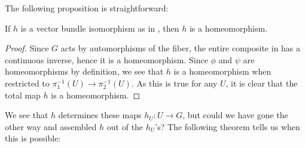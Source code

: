 \documentclass[11pt]{book}
\begin{document}
The following proposition is straightforward:

\begin{proposition} If $h$ is a vector bundle isomorphism as in , then $h$ is a homeomorphism.
\end{proposition}
\begin{proof} Since $G$ acts by automorphisms of the fiber, the entire composite in  has a continuous inverse, hence it is a homeomorphism. Since $\phi$ and $\psi$ are homeomorphisms by definition, we see that $h$ is a homeomorphism when restricted to $\pi_1^{-1}(U) \to \pi_2^{-1}(U)$. As this is true for any $U$, it is clear that the total map $h$ is a homeomorphism.
\end{proof}

We see that $h$ determines these maps $h_U \colon U \to G$, but could we have gone the other way and assembled $h$ out of the $h_U$'s? The following theorem tells us when this is possible:
\end{document}
